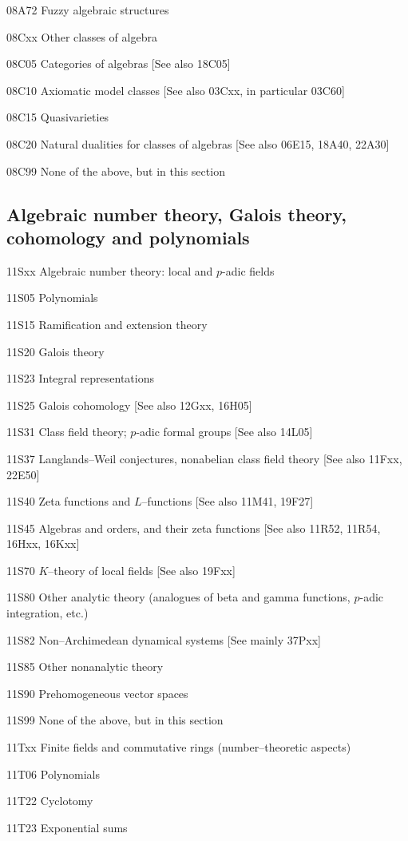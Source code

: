 \documentclass[12pt]{article}
\theoremstyle{plain}
\theoremstyle{definition}
\numberwithin{equation}{section}
\begin{document}
{08A72 Fuzzy algebraic structures

08Cxx Other classes of algebra

08C05 Categories of algebras [See also 18C05]

08C10 Axiomatic model classes [See also 03Cxx, in particular 03C60]

08C15 Quasivarieties

08C20 Natural dualities for classes of algebras [See also 06E15, 18A40, 22A30]

08C99 None of the above, but in this section

\subsection{Algebraic number theory, Galois theory, cohomology and polynomials}
11Sxx Algebraic number theory: local and $p$-adic fields

11S05 Polynomials

11S15 Ramification and extension theory

11S20 Galois theory

11S23 Integral representations

11S25 Galois cohomology [See also 12Gxx, 16H05]

11S31 Class field theory; $p$-adic formal groups [See also 14L05]

11S37 Langlands--Weil conjectures, nonabelian class field theory [See also 11Fxx, 22E50]

11S40 Zeta functions and $L$--functions [See also 11M41, 19F27]

11S45 Algebras and orders, and their zeta functions [See also 11R52, 11R54, 16Hxx, 16Kxx]

11S70 $K$--theory of local fields [See also 19Fxx]

11S80 Other analytic theory (analogues of beta and gamma functions, $p$-adic integration, etc.)

11S82 Non--Archimedean dynamical systems [See mainly 37Pxx]

11S85 Other nonanalytic theory

11S90 Prehomogeneous vector spaces

11S99 None of the above, but in this section

11Txx Finite fields and commutative rings (number--theoretic aspects)

11T06 Polynomials

11T22 Cyclotomy

11T23 Exponential sums

}
\end{document}
